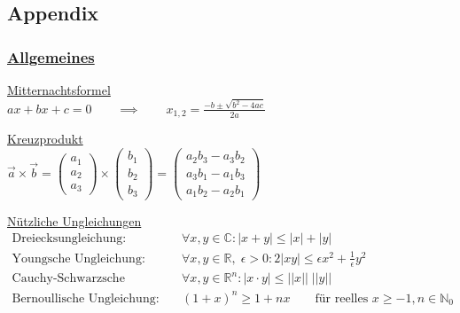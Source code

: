 \documentclass[6pt]{article}
\newcommand{\R}{\mathbb{R}}
\newcommand{\N}{\mathbb{N}}
\newcommand{\C}{\mathbb{C}}
\begin{document}
\begin{multicols*}{2}

\subsection*{Appendix}


\subsubsection*{\underline{Allgemeines}}

\underline{Mitternachtsformel} \vspace{2mm} \\
	$ a x + b x + c = 0 \qquad \implies \qquad x_{1,2} = \frac{-b \pm \sqrt{b^2-4ac}}{2a}$

\vspace{3mm}
\underline{Kreuzprodukt} \vspace{3mm} \\
	$ \vec{a} \times \vec{b} = \begin{pmatrix} a_1 \\ 	a_2 \\ a_3\end{pmatrix} \times \begin{pmatrix} b_1 \\ 	b_2 \\ b_3\end{pmatrix} = 
	\begin{pmatrix} a_2b_3 - a_3b_2 \\ 	a_3b_1 - a_1b_3 \\ a_1b_2 - a_2b_1\end{pmatrix}$

\vspace{3mm}
	\underline{Nützliche Ungleichungen}
	\vspace{-2mm}
	\begin{align*}
		\text{Dreiecksungleichung:} & \quad \forall x,y \in \C : |x+y| \leq |x| + |y| \\
		\text{Youngsche Ungleichung:} & \quad \forall x,y \in \R, \; \epsilon > 0 : 2 | x y | \leq \epsilon x^2 + \tfrac{1}{\epsilon} y^2 \\
		\text{Cauchy-Schwarzsche Ungleichung:} & \quad \forall x,y \in \R^n: |x \cdot y| \leq ||x|| \; ||y|| \\
		\text{Bernoullische Ungleichung:} & \quad (1 + x)^n \geq 1 + nx \qquad \text{f{\"u}r reelles }  x \geq -1, n \in \N_0
	\end{align*}


\end{multicols*}
\end{document}
